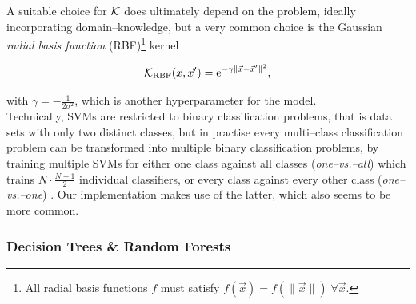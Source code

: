 A suitable choice for $\mathcal{K}$ does ultimately depend on the problem, ideally incorporating domain--knowledge, but a very common choice is the Gaussian \emph{radial basis function} (RBF)\footnote{All radial basis functions $f$ must satisfy $f(\vec x) = f(\|\vec x\|) \; \forall \vec x$.} kernel

\begin{equation}
\label{eq:rbf}
\mathcal{K}_{\text{RBF}}(\vec x, \vec x') = \mathrm{e}^{-\gamma \| \vec x - \vec x' \|^2},
\end{equation}

with $\gamma = -\frac{1}{2 \sigma^2}$, which is another hyperparameter for the model.\\

Technically, SVMs are restricted to binary classification problems, that is data sets with only two distinct classes, but in practise every multi--class classification problem can be transformed into multiple binary classification problems, \eg by training multiple SVMs for either one class against all classes (\emph{one--vs.--all}) which trains $N \cdot \frac{N-1}{2}$ individual classifiers, or every class against every other class (\emph{one--vs.--one}) \citep{knerr1990}. Our implementation makes use of the latter, which also seems to be more common.

\subsubsection{Decision Trees \& Random Forests}

